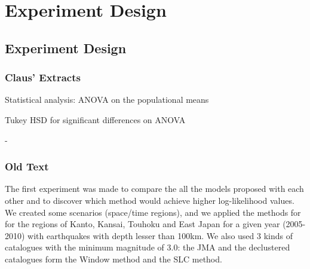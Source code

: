 

\section{Experiment Design}
\label{sec:experiment}





\subsection{Experiment Design}







\subsubsection*{Claus' Extracts}

Statistical analysis: ANOVA on the populational means

Tukey HSD for significant differences on ANOVA

- 

\subsubsection*{Old Text}

The first experiment was made to compare the all the models proposed
with each other and to discover which method would achieve higher
log-likelihood values. We created some scenarios (space/time regions),
and we applied the methods for for the regions of Kanto, Kansai,
Touhoku and East Japan for a given year (2005-2010) with earthquakes
with depth lesser than 100km. We also used 3 kinds of catalogues with
the minimum magnitude of 3.0: the JMA and the declustered catalogues
form the Window method and the SLC method.

